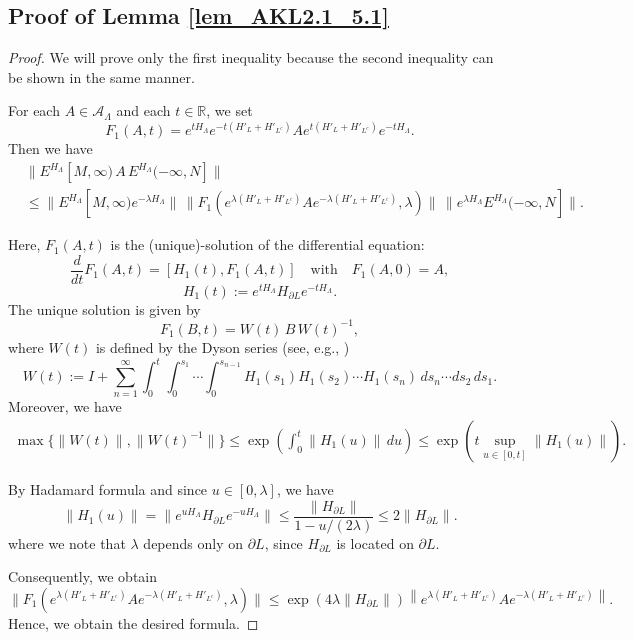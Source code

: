 \documentclass[11pt]{article}
\numberwithin{equation}{section}
\begin{document}
\subsection{Proof of Lemma \ref{lem_AKL2.1_5.1}}\label{S_AKL2.1_5.1}
\begin{proof}
We will prove only the first inequality because the second inequality can be shown in the same manner.

For each $A\in\mathcal{A}_\Lambda$ and each $t\in\mathbb{R}$, we set
\[
F_1(A,t)=e^{tH_\Lambda}e^{-t\left(H'_L+H'_{L^c}\right)} Ae^{t\left(H'_L+H'_{L^c}\right)}e^{-tH_\Lambda}.
\]
Then we have
\begin{align*}
&\|E^{H_\Lambda}[M,\infty) \,A\, E^{H_\Lambda}(-\infty,N]\|\\
&\leq \|E^{H_\Lambda}[M,\infty) e^{-\lambda H_\Lambda}\|\,
\|F_1(e^{\lambda \left(H'_L+H'_{L^c}\right)}A e^{-\lambda \left(H'_L+H'_{L^c}\right)},\lambda)\|\,
\|e^{\lambda H_\Lambda}E^{H_\Lambda}(-\infty,N]\|.
\end{align*}

Here, $F_1(A,t)$ is the (unique)-solution of the differential equation:
\[
\frac{d}{dt} F_1(A,t)=[H_1(t),F_1(A,t)]
\quad\text{with}\quad F_1(A,0)=A,
\]
\[
H_1(t):=e^{tH_\Lambda}H_{\partial L}e^{-tH_\Lambda}.
\]
The unique solution is given by
\[
F_1(B,t)=W(t)\,B\,W(t)^{-1},
\]
where $W(t)$ is defined by the Dyson series (see, e.g., \cite[Proposition 2.2]{Nachtergaele-Sims-Young})
\[
W(t):=I+\sum_{n=1}^\infty
\int_0^t \int_0^{s_1} \cdots
\int_0^{s_{n-1}}
H_1(s_1) H_1(s_2) \cdots H_1(s_n)
\,ds_n \cdots ds_2\,ds_1.
\]
Moreover, we have
\begin{align*}
\max\{\|W(t)\|,\|W(t)^{-1}\|\}
\leq\exp\left(\int_0^t \|H_1(u)\|\,du\right)
\leq \exp\left(t\sup_{u\in[0,t]}\|H_1(u)\|\right).
\end{align*}

By Hadamard formula and since $u\in[0,\lambda]$, we have 
\[
\|H_1(u)\|
=\|e^{uH_\Lambda}H_{\partial L}e^{-uH_\Lambda}\|
\leq \frac{\|H_{\partial L}\|}{1-u/(2\lambda)}
\leq 2\|H_{\partial L}\|.
\]
where we note that $\lambda$ depends only on $\partial L$, since $H_{\partial L}$ is located on $\partial L$.

Consequently, we obtain
\[
\|F_1(e^{\lambda(H'_L+H'_{L^c})}A e^{-\lambda(H'_L+H'_{L^c})},\lambda)\|
\leq \exp(4\lambda\|H_{\partial L}\|) \left\|e^{\lambda(H'_L+H'_{L^c})}A e^{-\lambda(H'_L+H'_{L^c})}\right\|.
\]
Hence, we obtain the desired formula.
\end{proof}
\end{document}
